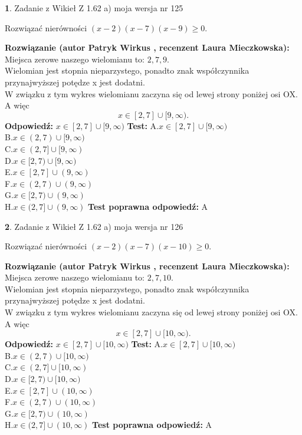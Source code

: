 \documentclass[12pt, a4paper]{article}
\theoremstyle{definition} %
\newtheorem{zad}{}
\newcommand{\zadStart}[1]{\begin{zad}#1\newline}
\newcommand{\zadStop}{\end{zad}}
\newcommand{\rozwStart}[2]{\noindent \textbf{Rozwiązanie (autor #1 , recenzent #2): }\newline}
\newcommand{\rozwStop}{\newline}
\newcommand{\odpStart}{\noindent \textbf{Odpowiedź:}\newline}
\newcommand{\odpStop}{\newline}
\newcommand{\testStart}{\noindent \textbf{Test:}\newline}
\newcommand{\testStop}{\newline}
\newcommand{\kluczStart}{\noindent \textbf{Test poprawna odpowiedź:}\newline}
\newcommand{\kluczStop}{\newline}
\begin{document}
\zadStart{Zadanie z Wikieł Z 1.62 a) moja wersja nr 125}

Rozwiązać nierówności $(x-2)(x-7)(x-9)\ge0$.
\zadStop
\rozwStart{Patryk Wirkus}{Laura Mieczkowska}
Miejsca zerowe naszego wielomianu to: $2, 7, 9$.\\
Wielomian jest stopnia nieparzystego, ponadto znak współczynnika przy\linebreak najwyższej potędze x jest dodatni.\\ W związku z tym wykres wielomianu zaczyna się od lewej strony poniżej osi OX. A więc $$x \in [2,7] \cup [9,\infty).$$
\rozwStop
\odpStart
$x \in [2,7] \cup [9,\infty)$
\odpStop
\testStart
A.$x \in [2,7] \cup [9,\infty)$\\
B.$x \in (2,7) \cup [9,\infty)$\\
C.$x \in (2,7] \cup [9,\infty)$\\
D.$x \in [2,7) \cup [9,\infty)$\\
E.$x \in [2,7] \cup (9,\infty)$\\
F.$x \in (2,7) \cup (9,\infty)$\\
G.$x \in [2,7) \cup (9,\infty)$\\
H.$x \in (2,7] \cup (9,\infty)$
\testStop
\kluczStart
A
\kluczStop



\zadStart{Zadanie z Wikieł Z 1.62 a) moja wersja nr 126}

Rozwiązać nierówności $(x-2)(x-7)(x-10)\ge0$.
\zadStop
\rozwStart{Patryk Wirkus}{Laura Mieczkowska}
Miejsca zerowe naszego wielomianu to: $2, 7, 10$.\\
Wielomian jest stopnia nieparzystego, ponadto znak współczynnika przy\linebreak najwyższej potędze x jest dodatni.\\ W związku z tym wykres wielomianu zaczyna się od lewej strony poniżej osi OX. A więc $$x \in [2,7] \cup [10,\infty).$$
\rozwStop
\odpStart
$x \in [2,7] \cup [10,\infty)$
\odpStop
\testStart
A.$x \in [2,7] \cup [10,\infty)$\\
B.$x \in (2,7) \cup [10,\infty)$\\
C.$x \in (2,7] \cup [10,\infty)$\\
D.$x \in [2,7) \cup [10,\infty)$\\
E.$x \in [2,7] \cup (10,\infty)$\\
F.$x \in (2,7) \cup (10,\infty)$\\
G.$x \in [2,7) \cup (10,\infty)$\\
H.$x \in (2,7] \cup (10,\infty)$
\testStop
\kluczStart
A
\kluczStop
\end{document}
